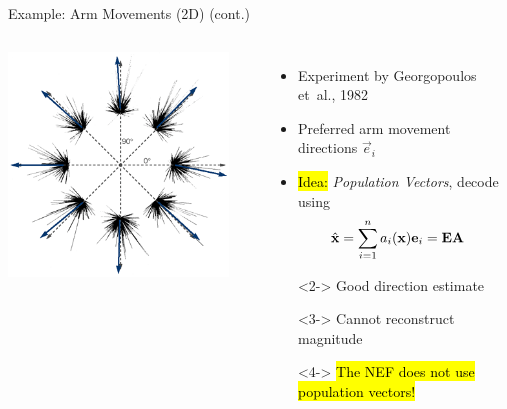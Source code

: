 \documentclass[handout,aspectratio=169]{beamer}
\begin{document}
\begin{frame}{Example: Arm Movements (2D) (cont.)}
	\begin{columns}
		\centering
		\includegraphics[width=0.9\textwidth]{media/georgopoulos_directions.png}%
		\begin{itemize}
			\setlength{\itemsep}{0.2cm}
			\item Experiment by Georgopoulos et~al., 1982
			\item Preferred arm movement directions $\vec e_i$
			\item \hl{Idea:} \emph{Population Vectors}, decode using
			\begin{align*}
				\hat{{\mathbf{x}}} &= \sum_{i=1}^n a_i({\mathbf{x}}) {\mathbf{e}}_i = {{\mathbf{E}}} {{\mathbf{A}}}
			\end{align*}
			\item[\OPlus]<2-> Good direction estimate
			\item[\OMinus]<3-> Cannot reconstruct magnitude
			\item[]<4-> \hl{The NEF does not use population vectors!}
		\end{itemize}
	\end{columns}
\end{frame}
\end{document}
